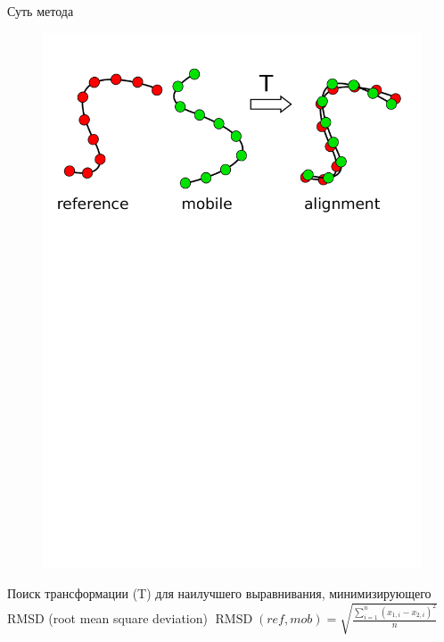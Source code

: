 \documentclass[utf8, professionalfonts]{beamer}
\begin{document}
\begin{frame}{Суть метода}
\begin{figure}[h]
\includegraphics[clip, trim=0 19.5cm 0 1cm, width=\linewidth]{method.pdf}
\end{figure}

Поиск трансформации (T) для наилучшего выравнивания, минимизирующего RMSD (root mean square deviation)
\begin{math}
\operatorname{RMSD}(ref, mob) = \sqrt{\frac{\sum_{i=1}^n (x_{1,i} - x_{2,i})^2}{n}}
\end{math}

\end{frame}
\end{document}
